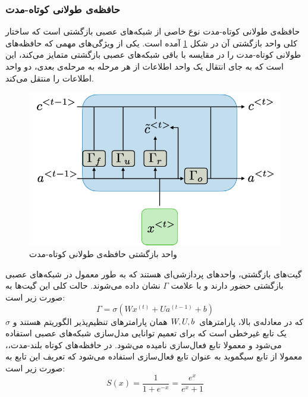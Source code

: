 \subsubsection{حافظه‌ی طولانی کوتاه-مدت}
حافظه‌ی طولانی کوتاه-مدت
نوع خاصی از شبکه‌های عصبی بازگشتی است که ساختار کلی  واحد بازگشتی آن در شکل
\ref{fig:lstmblock}
آمده است.
یکی از ویژگی‌های مهمی که حافظه‌های طولانی کوتاه-مدت را در مقایسه با باقی شبکه‌های عصبی بازگشتی متمایز می‌کند، این است که به جای انتقال یک واحد اطلاعات از هر مرحله به مرحله‌ی بعدی، دو واحد اطلاعات را منتقل می‌کند.

\begin{figure}
	\centering
	\includegraphics[scale=0.4]{figures/lstm-rec-unit.png}
	\caption [
	واحد بازگشتی حافظه‌ی طولانی کوتاه-مدت
	]{
	واحد بازگشتی حافظه‌ی طولانی کوتاه-مدت 
	\cite{rnncheat}
	}
	\label{fig:lstmblock}
\end{figure}

گیت‌های بازگشتی، واحدهای پردازشی‌ای هستند که به طور معمول در شبکه‌های عصبی بازگشتی حضور دارند و با علامت 
$\Gamma$
نشان داده می‌شوند. حالت کلی این گیت‌ها به صورت زیر است:
\begin{equation}
    \Gamma = \sigma(Wx^{(t)} + Ua^{(t-1)} + b)
\end{equation}
که در معادله‌ی بالا، پارامترهای
$W, U, b \hspace{0.5mm}$
همان پارامترهای تنظیم‌پذیر الگوریتم هستند و
$\sigma$
یک تابع غیرخطی است که برای تعمیم توانایی مدل‌سازی شبکه‌های عصبی استفاده می‌شود و معمولا تابع فعال‌سازی
نامیده می‌شود.
در حافظه‌های کوتاه بلند-مدت،، معمولا از تابع سیگموید
به عنوان تابع فعال‌سازی استفاده می‌شود که تعریف این تابع به صورت زیر است:
\begin{equation}
    S(x) = \frac{1}{1+e^{-x}} = \frac{e^x}{e^x + 1}
\end{equation}


